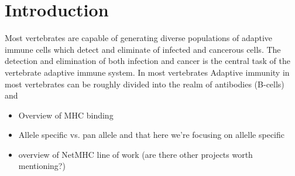 \section{Introduction}
 
Most vertebrates are capable of generating diverse populations of adaptive immune cells which detect and eliminate of infected and cancerous cells.
The detection and elimination of both infection and cancer is the central task of the vertebrate adaptive immune system. 
In most vertebrates \cite{Anderson_2004}
Adaptive immunity in most vertebrates can be roughly divided into the realm of antibodies (B-cells) and  


\begin{itemize}
\item Overview of MHC binding
\item Allele specific vs. pan allele and that here we're focusing on allelle specific
\item overview of NetMHC line of work (are there other projects worth mentioning?)
\end{itemize}
